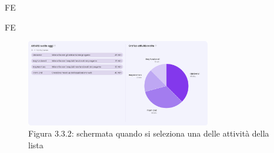 \begin{listaPersonale}{FE}
\begin{listaPersonale2}{FE}
        \begin{figure}[H]
            \centering
            \includegraphics[width=0.72\textwidth,height=0.2\textheight]{img/FrontEnd/Dashboard/Dashboard3.png}
            \caption{Figura 3.3.2: schermata quando si seleziona una delle attività della lista}
        \end{figure}
           

\end{listaPersonale2}
\end{listaPersonale}
